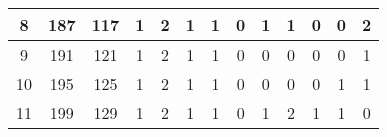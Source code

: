 \begin{sidewaystable}
\begin{tabular}{|c|c|c|c|c|c|c|c|c|c|c|c|c|}
		8                                                 & 187                                               & 117                                               & 1                                                 & 2                                                 & 1                                                 & 1                                                 & 0                                                 & 1                                                 & 1                                                 & 0                                                 & 0                                                 & 2                                                 \\ \hline
		9                                                 & 191                                               & 121                                               & 1                                                 & 2                                                 & 1                                                 & 1                                                 & 0                                                 & 0                                                 & 0                                                 & 0                                                 & 0                                                 & 1                                                 \\ \hline
		10                                                & 195                                               & 125                                               & 1                                                 & 2                                                 & 1                                                 & 1                                                 & 0                                                 & 0                                                 & 0                                                 & 0                                                 & 1                                                 & 1                                                 \\ \hline
		11                                                & 199                                               & 129                                               & 1                                                 & 2                                                 & 1                                                 & 1                                                 & 0                                                 & 1                                                 & 2                                                 & 1                                                 & 1                                                 & 0                                                 \\ \hline

\end{tabular}
\end{sidewaystable}
